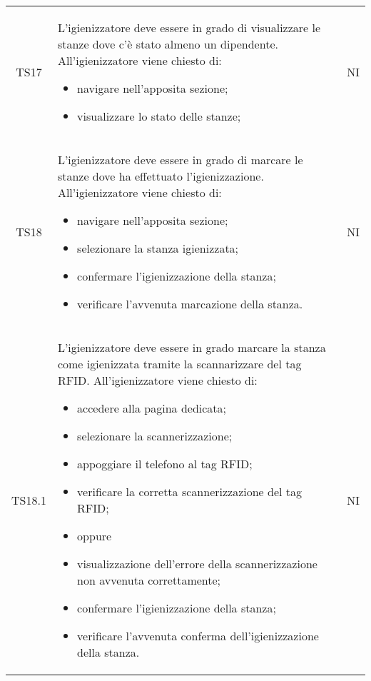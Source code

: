 {\begin{longtable}{ c C{11cm} c }
        TS17&
        L'igienizzatore deve essere in grado di visualizzare le stanze dove c'è stato almeno un dipendente.\newline
        All'igienizzatore viene chiesto di:
        \begin{itemize}
            \item navigare nell'apposita sezione;
            \item visualizzare lo stato delle stanze;
        \end{itemize}&
        NI\\

        TS18&
        L'igienizzatore deve essere in grado di marcare le stanze dove ha effettuato l'igienizzazione.\newline
        All'igienizzatore viene chiesto di:
        \begin{itemize}
            \item navigare nell'apposita sezione;
            \item selezionare la stanza igienizzata;
            \item confermare l'igienizzazione della stanza;
            \item verificare l'avvenuta marcazione della stanza.
        \end{itemize}&
        NI\\

        TS18.1&
        L'igienizzatore deve essere in grado marcare la stanza come igienizzata tramite la scannarizzare del tag RFID.\newline
        All'igienizzatore viene chiesto di:
        \begin{itemize}
            \item accedere alla pagina dedicata;
            \item selezionare la scannerizzazione;
            \item appoggiare il telefono al tag RFID;
            \item verificare la corretta scannerizzazione del tag RFID;
            \item [] oppure
            \item visualizzazione dell'errore della scannerizzazione non avvenuta correttamente;
            \item confermare l'igienizzazione della stanza;
            \item verificare l'avvenuta conferma dell'igienizzazione della stanza.
        \end{itemize}&
        NI\\


\end{longtable}}
